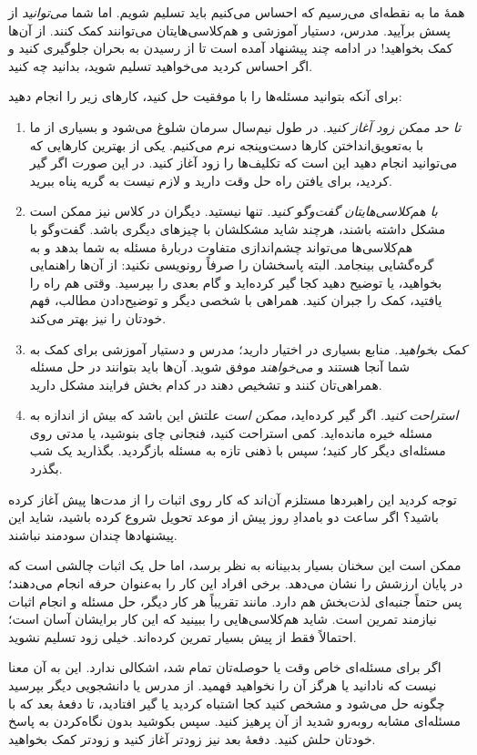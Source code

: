 \documentclass[../../../include/open-logic-section]{subfiles}
\begin{document}


همهٔ ما به نقطه‌ای می‌رسیم که احساس می‌کنیم باید تسلیم شویم. اما شما
\emph{می‌توانید} از پسش برآیید. مدرس، دستیار آموزشی و هم‌کلاسی‌هایتان
می‌توانند کمک کنند. از آن‌ها کمک بخواهید!{} در ادامه چند پیشنهاد آمده
است تا از رسیدن به بحران جلوگیری کنید و اگر احساس کردید می‌خواهید
تسلیم شوید، بدانید چه کنید.

برای آنکه بتوانید مسئله‌ها را با موفقیت حل کنید، کارهای زیر را انجام دهید:
\begin{enumerate}
\item \emph{تا حد ممکن زود آغاز کنید.} در طول نیم‌سال سرمان شلوغ
  می‌شود و بسیاری از ما با به‌تعویق‌انداختن کارها دست‌وپنجه نرم
  می‌کنیم. یکی از بهترین کارهایی که می‌توانید انجام دهید این است که
  تکلیف‌ها را زود آغاز کنید. در این صورت اگر گیر کردید، برای یافتن راه
  حل وقت دارید و لازم نیست به گریه پناه ببرید.
\item \emph{با هم‌کلاسی‌هایتان گفت‌وگو کنید.} تنها نیستید. دیگران در
  کلاس نیز ممکن است مشکل داشته باشند، هرچند شاید مشکلشان با چیزهای
  دیگری باشد. گفت‌وگو با هم‌کلاسی‌ها می‌تواند چشم‌اندازی متفاوت دربارهٔ
  مسئله به شما بدهد و به گره‌گشایی بینجامد. البته پاسخشان را صرفاً
  رونویسی نکنید: از آن‌ها راهنمایی بخواهید، یا توضیح دهید کجا گیر
  کرده‌اید و گام بعدی را بپرسید. وقتی هم راه را یافتید، کمک را جبران
  کنید. همراهی با شخصی دیگر و توضیح‌دادن مطالب، فهم خودتان را نیز بهتر
  می‌کند.
\item \emph{کمک بخواهید.} منابع بسیاری در اختیار دارید؛ مدرس و دستیار
  آموزشی برای کمک به شما آنجا هستند و \emph{می‌خواهند} موفق شوید.
  آن‌ها باید بتوانند در حل مسئله همراهی‌تان کنند و تشخیص دهند در کدام
  بخش فرایند مشکل دارید.
\item \emph{استراحت کنید.} اگر گیر کرده‌اید، \emph{ممکن است} علتش این
  باشد که بیش از اندازه به مسئله خیره مانده‌اید. کمی استراحت کنید،
  فنجانی چای بنوشید، یا مدتی روی مسئله‌ای دیگر کار کنید؛ سپس با ذهنی
  تازه به مسئله بازگردید. بگذارید یک شب بگذرد.
\end{enumerate}

توجه کردید این راهبردها مستلزم آن‌اند که کار روی اثبات را از مدت‌ها
پیش آغاز کرده باشید؟ اگر ساعت دو بامدادِ روز پیش از موعد تحویل شروع
کرده باشید، شاید این پیشنهادها چندان سودمند نباشند.

ممکن است این سخنان بسیار بدبینانه به نظر برسد، اما حل یک اثبات چالشی
است که در پایان ارزشش را نشان می‌دهد. برخی افراد این کار را به‌عنوان
حرفه انجام می‌دهند؛ پس حتماً جنبه‌ای لذت‌بخش هم دارد. مانند تقریباً هر
کار دیگر، حل مسئله و انجام اثبات نیازمند تمرین است. شاید هم‌کلاسی‌هایی
را ببینید که این کار برایشان آسان است؛ احتمالاً فقط از پیش بسیار تمرین
کرده‌اند. خیلی زود تسلیم نشوید.

اگر برای مسئله‌ای خاص وقت یا حوصله‌تان تمام شد، اشکالی ندارد. این به
آن معنا نیست که نادانید یا هرگز آن را نخواهید فهمید. از مدرس یا
دانشجویی دیگر بپرسید چگونه حل می‌شود و مشخص کنید کجا اشتباه کردید یا
گیر افتادید، تا دفعهٔ بعد که با مسئله‌ای مشابه روبه‌رو شدید از آن
پرهیز کنید. سپس بکوشید بدون نگاه‌کردن به پاسخ خودتان حلش کنید. دفعهٔ
بعد نیز زودتر آغاز کنید و زودتر کمک بخواهید.
\end{document}
